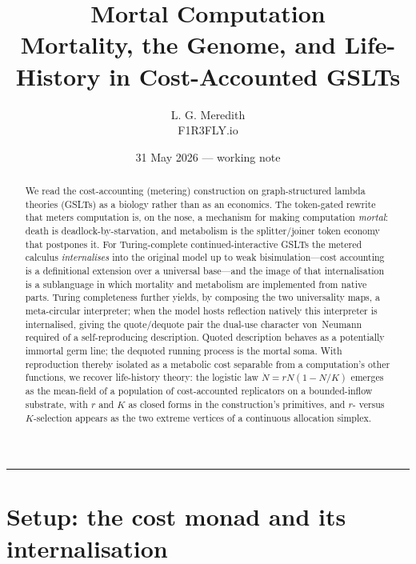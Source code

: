\documentclass[11pt]{article}
\title{\vspace{-3em}
  {\color{f1r3}\Large\bfseries Mortal Computation}\\[0.35em]
  {\large Mortality, the Genome, and Life-History in Cost-Accounted GSLTs}}
\author{L. G. Meredith \\ {\small F1R3FLY.io}}
\date{\small 31 May 2026 --- working note}
\theoremstyle{plain}
\theoremstyle{definition}
\theoremstyle{remark}
\newcommand{\hrulethick}{\noindent\textcolor{f1r3}{\rule{\linewidth}{1.2pt}}}
\begin{document}
\maketitle
\vspace{-1.5em}
\hrulethick
\vspace{1em}

\begin{abstract}
\noindent
We read the cost-accounting (metering) construction on graph-structured lambda
theories (GSLTs) as a biology rather than as an economics. The token-gated
rewrite that meters computation is, on the nose, a mechanism for making
computation \emph{mortal}: death is deadlock-by-starvation, and metabolism is
the splitter/joiner token economy that postpones it. For Turing-complete
continued-interactive GSLTs the metered calculus \emph{internalises} into the
original model up to weak bisimulation---cost accounting is a definitional
extension over a universal base---and the image of that internalisation is a
sublanguage in which mortality and metabolism are implemented from native
parts. Turing
completeness further yields, by composing the two universality maps, a
meta-circular interpreter; when the model hosts reflection natively this
interpreter is internalised, giving the quote/dequote pair the dual-use
character von~Neumann required of a self-reproducing description. Quoted
description behaves as a potentially immortal germ line; the dequoted running
process is the mortal soma. With reproduction thereby isolated as a metabolic
cost separable from a computation's other functions, we recover life-history
theory: the logistic law $\dot N = rN(1-N/K)$ emerges as the mean-field of a
population of cost-accounted replicators on a bounded-inflow substrate, with
$r$ and $K$ as closed forms in the construction's primitives, and $r$- versus
$K$-selection appears as the two extreme vertices of a continuous allocation
simplex.
\end{abstract}

\vspace{0.5em}

\section{Setup: the cost monad and its internalisation}
\label{sec:setup}
\end{document}
